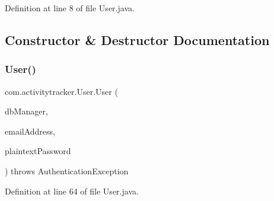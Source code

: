 Definition at line 8 of file User.\+java.



\subsection{Constructor \& Destructor Documentation}
\mbox{\label{classcom_1_1activitytracker_1_1_user_ae9f2a2555aa41e80ade28223907e01ab}} 
\subsubsection{\texorpdfstring{User()}{User()}}
{\footnotesize\ttfamily com.\+activitytracker.\+User.\+User (\begin{DoxyParamCaption}\item[{final \mbox{\hyperlink{classcom_1_1activitytracker_1_1_d_b_manager}{D\+B\+Manager}}}]{db\+Manager,  }\item[{final String}]{email\+Address,  }\item[{final String}]{plaintext\+Password }\end{DoxyParamCaption}) throws Authentication\+Exception\hspace{0.3cm}{\ttfamily [package]}}



Definition at line 64 of file User.\+java.


